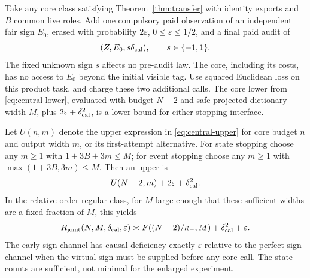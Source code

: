 \begin{theorem}\label{thm:joint}
Take any core class satisfying Theorem~\ref{thm:transfer} with identity exports and $B$ common live roles. Add one compulsory paid observation of an independent fair sign $E_0$, erased with probability $2\varepsilon$, $0\le\varepsilon\le1/2$, and a final paid audit of
\[
 (Z,E_0,s\delta_{\rm cal}),\qquad s\in\{-1,1\}.
\]
The fixed unknown sign $s$ affects no pre-audit law. The core, including its costs, has no access to $E_0$ beyond the initial visible tag. Use squared Euclidean loss on this product task, and charge these two additional calls. The core lower from \eqref{eq:central-lower}, evaluated with budget $N-2$ and safe projected dictionary width $M$, plus $2\varepsilon+\delta_{\rm cal}^2$, is a lower bound for either stopping interface.

Let $U(n,m)$ denote the upper expression in \eqref{eq:central-upper} for core budget $n$ and output width $m$, or its first-attempt alternative. For state stopping choose any $m\ge1$ with $1+3B+3m\le M$; for event stopping choose any $m\ge1$ with $\max(1+3B,3m)\le M$. Then an upper is
\begin{equation}\label{eq:joint-upper}
 U(N-2,m)+2\varepsilon+\delta_{\rm cal}^2.
\end{equation}
In the relative-order regular class, for $M$ large enough that these sufficient widths are a fixed fraction of $M$, this yields
\begin{equation}\label{eq:joint-law}
 R_{\mathrm{joint}}(N,M,\delta_{\rm cal},\varepsilon)
 \asymp F((N-2)/\kappa_-,M)+\delta_{\rm cal}^2+\varepsilon.
\end{equation}
The early sign channel has causal deficiency exactly $\varepsilon$ relative to the perfect-sign channel when the virtual sign must be supplied before any core call. The state counts are sufficient, not minimal for the enlarged experiment.
\end{theorem}
